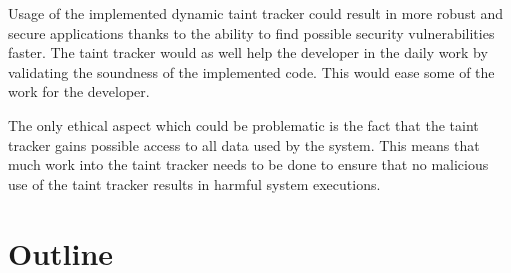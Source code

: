 Usage of the implemented dynamic taint tracker could result in more robust and secure applications thanks to the ability to find possible security vulnerabilities faster. The taint tracker would as well help the developer in the daily work by validating the soundness of the implemented code. This would ease some of the work for the developer.

The only ethical aspect which could be problematic is the fact that the taint tracker gains possible access to all data used by the system. This means that much work into the taint tracker needs to be done to ensure that no malicious use of the taint tracker results in harmful system executions.



\section{Outline}
\label{Structure}
